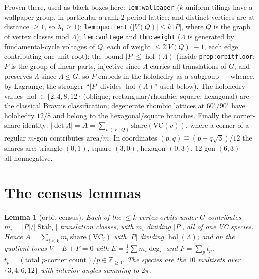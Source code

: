 \documentclass[11pt,a4paper,oneside]{article}
\theoremstyle{plain}
\newtheorem{lemma}[theorem]{Lemma}
\theoremstyle{definition}
\theoremstyle{remark}
\DeclareMathOperator{\hol}{hol}
\DeclareMathOperator{\Stab}{Stab}
\newcommand{\ZZ}{\mathbb{Z}}
\begin{document}
Proven there, used as black boxes here: \texttt{lem:wallpaper} ($k$-uniform tilings have a
wallpaper group, in particular a rank-$2$ period lattice; and distinct vertices are at
distance $\ge 1$, so $\lambda_1 \ge 1$); \texttt{lem:quotient} ($|V(Q)| \le k\,|P|$, where
$Q$ is the graph of vertex classes mod $\Lambda$); \texttt{lem:voltage} and
\texttt{thm:weight} ($\Lambda$ is generated by fundamental-cycle voltages of $Q$, each of
weight $\le 2|V(Q)|-1$, each edge contributing one unit root); the bound $|P| \le
\hol(\Lambda)$ (inside \texttt{prop:orbitfloor}: $P$ is the group of linear parts, injective
since $\Lambda$ carries all translations of $G$, and preserves $\Lambda$ since $\Lambda
\trianglelefteq G$, so $P$ embeds in the holohedry as a subgroup --- whence, by Lagrange,
the stronger ``$|P|$ divides $\hol(\Lambda)$'' used below). The holohedry values
$\hol \in \{2,4,8,12\}$ (oblique; rectangular/rhombic; square; hexagonal) are the classical
Bravais classification; degenerate rhombic lattices at $60^\circ/90^\circ$ have holohedry
$12/8$ and belong to the hexagonal/square branches. Finally the corner-share identity:
$|{\det}\Lambda| = A = \sum_{v \in V(Q)} \mathrm{share}(\mathrm{VC}(v))$, where a corner of
a regular $m$-gon contributes $\mathrm{area}/m$. In coordinates $(p, q) \mathrel{\hat=}
(p+q\sqrt3)/12$ the shares are: triangle $(0,1)$, square $(3,0)$, hexagon $(0,3)$,
$12$-gon $(6,3)$ --- all nonnegative.

\section{The census lemmas}\label{sec:lemmas}

\begin{lemma}[orbit census]\label{lem:census}
Each of the $\le k$ vertex orbits under $G$ contributes $m_i = |P|/|\Stab_i|$ translation
classes, with $m_i$ dividing $|P|$, all of one VC species. Hence
$A = \sum_{i \le k} m_i\,\mathrm{share}(\mathrm{VC}_i)$ with $|P|$ dividing $\hol(\Lambda)$;
and on the quotient torus $V - E + F = 0$ with $E = \tfrac12\sum m_i \deg_i$ and
$F = \sum_p t_p$, $t_p = (\text{total $p$-corner count})/p \in \ZZ_{\ge 0}$. The species are
the $10$ multisets over $\{3,4,6,12\}$ with interior angles summing to $2\pi$.
\end{lemma}
\end{document}
